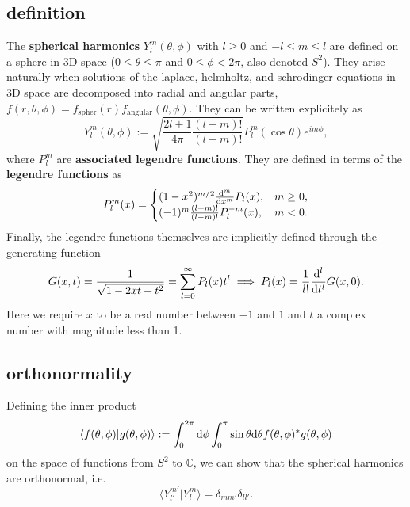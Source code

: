 \documentclass[11pt]{article} %
\DeclareRobustCommand{\d}{\ifmmode\text{d}\else d\fi}
\begin{document}
\subsection{definition}
The \textbf{spherical harmonics} $Y_{l}^{m}(\theta, \phi)$ with $l \geq 0$ and $-l\leq m\leq l$ are defined on a sphere in 3D space ($0\leq\theta\leq \pi$ and $0\leq\phi<2\pi$, also denoted $S^2$). They arise naturally when solutions of the laplace, helmholtz, and schrodinger equations in 3D space are decomposed into radial and angular parts, $f(r, \theta, \phi) = f_{\text{spher}}(r)f_{\text{angular}}(\theta, \phi)$. They can be written explicitely as
\begin{equation}
    Y^m_l(\theta, \phi) := \sqrt{\frac{2l+1}{4\pi}\frac{(l-m)!}{(l+m)!}}P_l^m(\cos\theta)e^{im\phi},
\end{equation}
where $P_l^m$ are \textbf{associated legendre functions}. They are defined in terms of the \textbf{legendre functions} as
\begin{equation}
    P_l^m(x) = \begin{cases}
        (1-x^2)^{m/2}\frac{\d^m}{\d x^m}P_l(x), & m \geq 0,\\
        (-1)^m\frac{(l+m)!}{(l-m)!}P_l^{-m}(x), & m < 0.
    \end{cases}
\end{equation}
Finally, the legendre functions themselves are implicitly defined through the generating function
\begin{equation}
    G(x, t) = \frac{1}{\sqrt{1 - 2xt + t^2}} = \sum_{l=0}^\infty P_l(x)t^l \implies P_l(x) = \frac{1}{l!}\frac{\d ^l}{\d t^l}G(x, 0).
\end{equation}
Here we require $x$ to be a real number between $-1$ and $1$ and $t$ a complex number with magnitude less than 1.

\subsection{orthonormality}
Defining the inner product
\begin{equation}
    \langle f(\theta, \phi)|g(\theta, \phi)\rangle := \int_0^{2\pi}\d\phi\int_0^\pi\sin\theta\d\theta f(\theta, \phi)^*g(\theta, \phi)
\end{equation}
on the space of functions from $S^2$ to $\mathbb C$, we can show that the spherical harmonics are orthonormal, i.e.
\begin{equation}
    \langle Y^{m'}_{l'} | Y^{m}_{l} \rangle = \delta_{mm'}\delta_{ll'}.
\end{equation}
\end{document}

